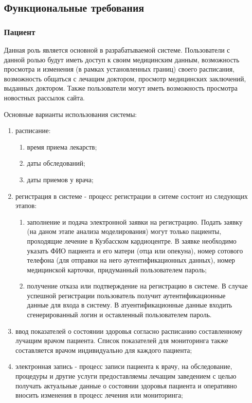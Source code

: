 \subsection{Функциональные требования}
\subsubsection{Пациент}
Данная роль является основной в разрабатываемой системе. Пользователи с данной
ролью будут иметь доступ к своим медицинским данным, возможность просмотра и
изменения (в рамках установленных границ) своего расписания, возможность
общаться с лечащим доктором, просмотр медицинских заключений, выданных доктором.
Также пользователи могут иметь возможность просмотра новостных рассылок сайта.

Основные варианты использования системы:

\begin{enumerate}
  \item расписание:
  \begin{enumerate}
    \item время приема лекарств;
    \item даты обследований;
    \item даты приемов у врача;     
  \end{enumerate}
  \item регистрация в системе - процесс регистрации в ситеме состоит из
  следующих этапов:
  \begin{enumerate}
    \item заполнение и подача электронной заявки на регистрацию. Подать заявку
    (на даном этапе анализа моделирования) могут только пациенты, проходящие
    лечение в Кузбасском кардиоцентре. 
    В заявке необходимо указать ФИО пациента и его матери (отца или опекуна), номер сотового телефона (для отправки на него аутентификационных данных), номер медицинской карточки, придуманный пользователем пароль;
    \item получение отказа или подтверждение на регистрацию в системе. В случае
    успешной регистрации пользователь получит аутентификационные данные для
    входа в систему. В атуентификационные данные входить сгенерированный логин и
    оставленный пользователем пароль.
  \end{enumerate}
  \item ввод показателей о состоянии здоровья согласно расписанию составленному
лучащим врачом пациента. Список показателей для мониторинга также составляется
врачом индивидуально для каждого пациента;
  \item электронная запись - процесс записи пациента к врачу, на обследование,
процедуры и другие услуги предоставляемы лечащим заведением с целью получать
актуальные данные о состоянии здоровья пациента и оперативно вносить изменения в процесс лечения или мониторинга;
\end{enumerate}

